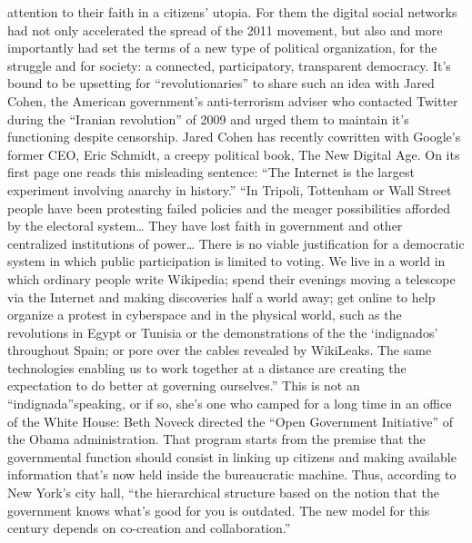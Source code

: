 \documentclass[landscape,twocolumn,letterpaper]{article}
\begin{document}
attention to their faith in a citizens’ utopia. For them the digital
social networks had not only accelerated the spread of the 2011
movement, but also and more importantly had set the terms of a new
type of political organization, for the struggle and for society: a
connected, participatory, transparent democracy. It’s bound to be
upsetting for “revolutionaries” to share such an idea with Jared
Cohen, the American government’s anti-terrorism adviser who contacted
Twitter during the “Iranian revolution” of 2009 and urged them to
maintain it’s functioning despite censorship. Jared Cohen has recently
cowritten with Google’s former CEO, Eric Schmidt, a creepy political
book, The New Digital Age. On its first page one reads this misleading
sentence: “The Internet is the largest experiment involving anarchy in
history.” “In Tripoli, Tottenham or Wall Street people have been
protesting failed policies and the meager possibilities afforded by
the electoral system… They have lost faith in government and other
centralized institutions of power… There is no viable justification
for a democratic system in which public participation is limited to
voting. We live in a world in which ordinary people write Wikipedia;
spend their evenings moving a telescope via the Internet and making
discoveries half a world away; get online to help organize a protest
in cyberspace and in the physical world, such as the revolutions in
Egypt or Tunisia or the demonstrations of the the ‘indignados’
throughout Spain; or pore over the cables revealed by WikiLeaks. The
same technologies enabling us to work together at a distance are
creating the expectation to do better at governing ourselves.” This is
not an “indignada”speaking, or if so, she’s one who camped for a long
time in an office of the White House: Beth Noveck directed the “Open
Government Initiative” of the Obama administration. That program
starts from the premise that the governmental function should consist
in linking up citizens and making available information that’s now
held inside the bureaucratic machine. Thus, according to New York’s
city hall, “the hierarchical structure based on the notion that the
government knows what’s good for you is outdated. The new model for
this century depends on co-creation and collaboration.”
\end{document}
